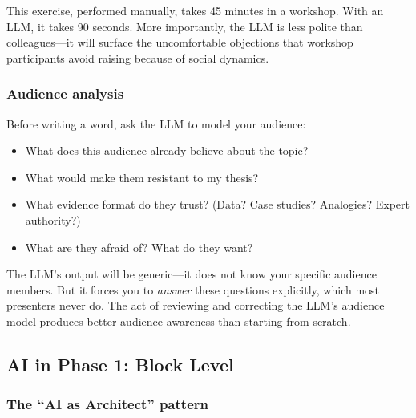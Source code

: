 This exercise, performed manually, takes 45 minutes in a workshop. With an LLM, it takes 90 seconds. More importantly, the LLM is less polite than colleagues---it will surface the uncomfortable objections that workshop participants avoid raising because of social dynamics.

\subsubsection{Audience analysis}

Before writing a word, ask the LLM to model your audience:

\begin{itemize}
  \item What does this audience already believe about the topic?
  \item What would make them resistant to my thesis?
  \item What evidence format do they trust? (Data? Case studies? Analogies? Expert authority?)
  \item What are they afraid of? What do they want?
\end{itemize}

The LLM's output will be generic---it does not know your specific audience members. But it forces you to \emph{answer} these questions explicitly, which most presenters never do. The act of reviewing and correcting the LLM's audience model produces better audience awareness than starting from scratch.

\subsection{AI in Phase 1: Block Level}

\subsubsection{The ``AI as Architect'' pattern}

